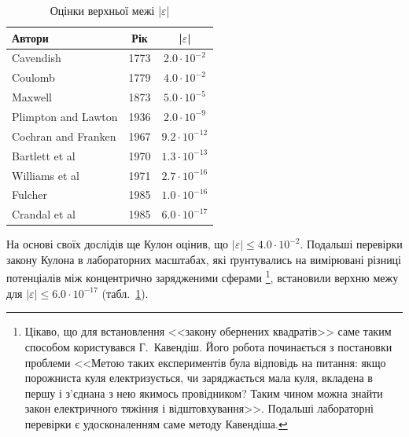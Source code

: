 \begin{table}\centering\small
\caption{Оцінки  верхньої межі |$\varepsilon$|\protect\footnotemark}
\label{tab:epsilon}
\begin{tabular}{lcc}
    \toprule
    Автори                 & Рік  &      |$\varepsilon$|      \\ \midrule
    Cavendish              & 1773 &  $2.0 \cdot 10^{-2}  $  \\
    Coulomb                & 1779 &  $4.0 \cdot 10^{-2}  $  \\
    Maxwell                & 1873 &  $5.0 \cdot 10^{-5}  $  \\
    Plimpton  and  Lawton  & 1936 &  $2.0 \cdot 10^{-9}  $  \\
    Cochran  and  Franken  & 1967 &  $9.2 \cdot 10^{-12} $  \\
    Bartlett  et  al       & 1970 &  $1.3 \cdot 10^{-13} $  \\
    Williams  et  al       & 1971 &  $2.7 \cdot 10^{-16} $  \\
    Fulcher                & 1985 &  $1.0 \cdot 10^{-16} $  \\
    Crandal et al          & 1985 &  $6.0 \cdot 10^{-17} $  \\
  \bottomrule
\end{tabular}
\end{table}
%
На основі своїх дослідів ще Кулон оцінив, що $|\varepsilon| \le 4.0 \cdot 10^{-2}$. Подальші перевірки закону Кулона в лабораторних масштабах, які ґрунтувались на вимірювані різниці потенціалів між концентрично зарядженими сферами%
%
\footnote{Цікаво, що для встановлення <<закону обернених квадратів>> саме таким способом користувався Г.~Кавендіш. Його робота починається з постановки проблеми <<Метою таких експериментів була відповідь на питання:
якщо порожниста куля електризується, чи заряджається мала куля, вкладена в першу і з'єднана з нею якимось
провідником? Таким чином можна знайти закон електричного тяжіння і відштовхування>>. Подальші лабораторні перевірки є удосконаленням саме методу Кавендіша.
}, %
%
встановили верхню межу для $ |\varepsilon| \le  6.0 \cdot 10^{-17}$ (табл.~\ref{tab:epsilon}).

